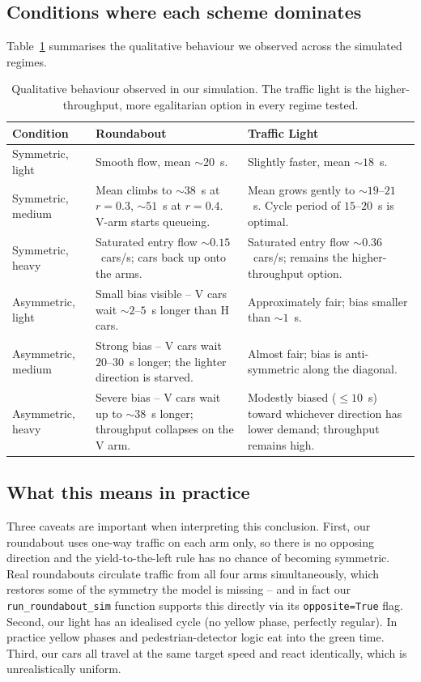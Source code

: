 \documentclass[11pt]{article}
\begin{document}
\subsection{Conditions where each scheme dominates}
Table~\ref{tab:comparison} summarises the qualitative behaviour we observed across the simulated regimes.

\begin{table}[H]
\centering
\renewcommand{\arraystretch}{1.3}
\small
\begin{tabular}{|p{3cm}|p{5.6cm}|p{5.6cm}|}
\hline
\textbf{Condition} & \textbf{Roundabout} & \textbf{Traffic Light} \\ \hline
Symmetric, light & Smooth flow, mean $\sim 20$~s. & Slightly faster, mean $\sim 18$~s. \\ \hline
Symmetric, medium & Mean climbs to $\sim 38$~s at $r=0.3$, $\sim 51$~s at $r=0.4$. V-arm starts queueing. & Mean grows gently to $\sim 19$--$21$~s. Cycle period of $15$--$20$~s is optimal. \\ \hline
Symmetric, heavy & Saturated entry flow $\sim 0.15$~cars/s; cars back up onto the arms. & Saturated entry flow $\sim 0.36$~cars/s; remains the higher-throughput option. \\ \hline
Asymmetric, light & Small bias visible -- V cars wait $\sim 2$--$5$~s longer than H cars. & Approximately fair; bias smaller than $\sim 1$~s. \\ \hline
Asymmetric, medium & Strong bias -- V cars wait $20$--$30$~s longer; the lighter direction is starved. & Almost fair; bias is anti-symmetric along the diagonal. \\ \hline
Asymmetric, heavy & Severe bias -- V cars wait up to $\sim 38$~s longer; throughput collapses on the V arm. & Modestly biased ($\le 10$~s) toward whichever direction has lower demand; throughput remains high. \\ \hline
\end{tabular}
\caption{Qualitative behaviour observed in our simulation. The traffic light is the higher-throughput, more egalitarian option in every regime tested.}
\label{tab:comparison}
\end{table}

\subsection{What this means in practice}
Three caveats are important when interpreting this conclusion. First, our roundabout uses one-way traffic on each arm only, so there is no opposing direction and the yield-to-the-left rule has no chance of becoming symmetric. Real roundabouts circulate traffic from all four arms simultaneously, which restores some of the symmetry the model is missing -- and in fact our \texttt{run\_roundabout\_sim} function supports this directly via its \texttt{opposite=True} flag. Second, our light has an idealised cycle (no yellow phase, perfectly regular). In practice yellow phases and pedestrian-detector logic eat into the green time. Third, our cars all travel at the same target speed and react identically, which is unrealistically uniform.
\end{document}
